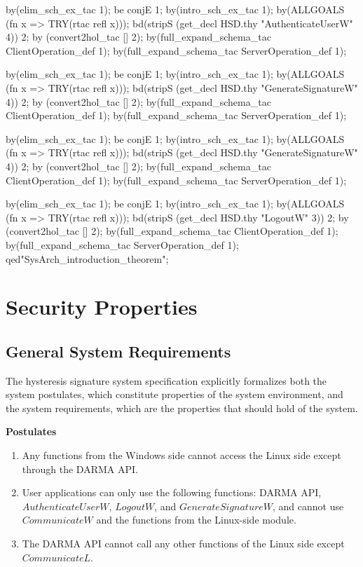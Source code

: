 \documentclass[a4paper,pdftex]{article}
\newenvironment{holz-ml}{\comment}{\endcomment}
\begin{document}
\begin{holz-ml}
by(elim_sch_ex_tac 1);
be conjE 1;
by(intro_sch_ex_tac 1);
by(ALLGOALS (fn x => TRY(rtac refl x)));
bd(stripS (get_decl HSD.thy "AuthenticateUserW" 4)) 2; 
by (convert2hol_tac [] 2); 
by(full_expand_schema_tac ClientOperation_def 1);
by(full_expand_schema_tac ServerOperation_def 1);

by(elim_sch_ex_tac 1);
be conjE 1;
by(intro_sch_ex_tac 1);
by(ALLGOALS (fn x => TRY(rtac refl x)));
bd(stripS (get_decl HSD.thy "GenerateSignatureW" 4)) 2; 
by (convert2hol_tac [] 2); 
by(full_expand_schema_tac ClientOperation_def 1);
by(full_expand_schema_tac ServerOperation_def 1);

by(elim_sch_ex_tac 1);
be conjE 1;
by(intro_sch_ex_tac 1);
by(ALLGOALS (fn x => TRY(rtac refl x)));
bd(stripS (get_decl HSD.thy "GenerateSignatureW" 4)) 2; 
by (convert2hol_tac [] 2); 
by(full_expand_schema_tac ClientOperation_def 1);
by(full_expand_schema_tac ServerOperation_def 1);

by(elim_sch_ex_tac 1);
be conjE 1;
by(intro_sch_ex_tac 1);
by(ALLGOALS (fn x => TRY(rtac refl x)));
bd(stripS (get_decl HSD.thy "LogoutW" 3)) 2; 
by (convert2hol_tac [] 2); 
by(full_expand_schema_tac ClientOperation_def 1);
by(full_expand_schema_tac ServerOperation_def 1);
qed"SysArch_introduction_theorem";





\end{holz-ml}


\section{Security Properties} \label{sec-props}


\subsection{General System Requirements}
The hysteresis signature system specification explicitly formalizes
both the system postulates, which constitute properties of the system
environment, and the system requirements, which are the properties
that should hold of the system.

\textbf{Postulates}
\begin{enumerate}
\item Any functions from the Windows side cannot access the Linux
  side except through the DARMA API.
\item User applications can only use the following functions: DARMA
  API, $AuthenticateUserW$, $LogoutW$, and $GenerateSignatureW$, and
  cannot use $CommunicateW$ and the functions from the Linux-side
  module.
\item The DARMA API cannot call any other functions of the Linux side
  except $CommunicateL$.
\end{enumerate}
\end{document}
